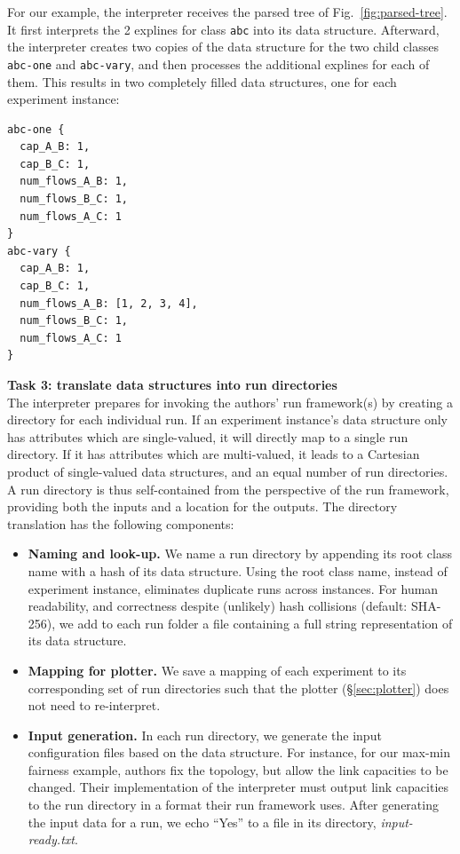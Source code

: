 For our example, the interpreter receives the parsed tree of Fig.~\ref{fig:parsed-tree}. It first interprets the 2 explines for class \texttt{abc} into its data structure. Afterward, the interpreter creates two copies of the data structure for the two child classes \texttt{abc-one} and \texttt{abc-vary}, and then processes the additional explines for each of them. This results in two completely filled data structures, one for each experiment instance:
\vspace{0in}
\begin{verbatim}abc-one {
  cap_A_B: 1,
  cap_B_C: 1,
  num_flows_A_B: 1,
  num_flows_B_C: 1,
  num_flows_A_C: 1
}
abc-vary { 
  cap_A_B: 1,
  cap_B_C: 1,
  num_flows_A_B: [1, 2, 3, 4],
  num_flows_B_C: 1,
  num_flows_A_C: 1
}\end{verbatim}
\vspace{-0in}
\noindent\textbf{Task 3: translate data structures into run directories}\\
The interpreter prepares for invoking the authors' run framework(s) by creating a directory for each individual run. If an experiment instance's data structure only has attributes which are single-valued, it will directly map to a single run directory. If it has attributes which are multi-valued, it leads to a Cartesian product of single-valued data structures, and an equal number of run directories. A run directory is thus self-contained from the perspective of the run framework, providing both the inputs and a location for the outputs. The directory translation has the following components:

\begin{itemize}[leftmargin=12pt,itemsep=2pt,topsep=2pt]

    \item \textbf{Naming and look-up.} We name a run directory by appending its root class name with a hash of its data structure. Using the root class name, instead of experiment instance, eliminates duplicate runs across instances. For human readability, and correctness despite (unlikely) hash collisions (default: SHA-256), 
    we add to each run folder a file containing a full string representation of its data structure.
    
    \item \textbf{Mapping for plotter.} We save a mapping of each experiment to its corresponding set of run directories such that the plotter (\S\ref{sec:plotter}) does not need to re-interpret.

    \item \textbf{Input generation.} In each run directory, we generate the input configuration files based on the data structure. For instance, for our max-min fairness example, authors fix the topology, but allow the link capacities to be changed. Their implementation of the interpreter must output link capacities to the run directory in a format their run framework uses. After generating the input data for a run, we echo ``Yes'' to a file in its directory, \textit{input-ready.txt}.
    
\end{itemize}

